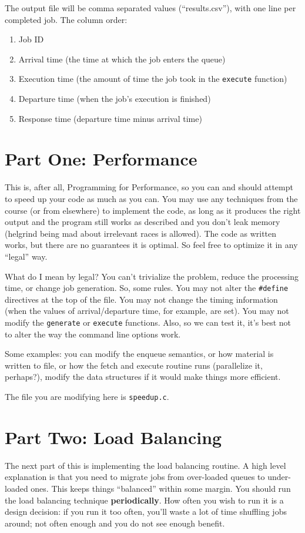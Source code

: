 \documentclass[letterpaper,10pt]{article}
\begin{document}
The output file will be comma separated values (``results.csv''), with one line per completed job. The column order:
\begin{enumerate}
	\item Job ID
	\item Arrival time (the time at which the job enters the queue)
	\item Execution time (the amount of time the job took in the \texttt{execute} function)
	\item Departure time (when the job's execution is finished)
	\item Response time (departure time minus arrival time)
\end{enumerate}


\section*{Part One: Performance}

This is, after all, Programming for Performance, so you can and should attempt to speed up your code as much as you can. You may use any techniques from the course (or from elsewhere) to implement the code, as long as it produces the right output and the program still works as described and you don't leak memory (helgrind being mad about irrelevant races is allowed). The code as written works, but there are no guarantees it is optimal. So feel free to optimize it in any ``legal'' way.

What do I mean by legal? You can't trivialize the problem, reduce the processing time, or change job generation. So, some rules. You may not alter the \texttt{\#define} directives at the top of the file. You may not change the timing information (when the values of arrival/departure time, for example, are set). You may not modify the \texttt{generate} or \texttt{execute} functions. Also, so we can test it, it's best not to alter the way the command line options work.

Some examples: you can modify the enqueue semantics, or how material is written to file, or how the fetch and execute routine runs (parallelize it, perhaps?), modify the data structures if it would make things more efficient.

The file you are modifying here is \texttt{speedup.c}.


\section*{Part Two: Load Balancing}
The next part of this is implementing the load balancing routine. A high level explanation is that you need to migrate jobs from over-loaded queues to under-loaded ones. This keeps things ``balanced'' within some margin. You should run the load balancing technique \textbf{periodically}. How often you wish to run it is a design decision: if you run it too often, you'll waste a lot of time shuffling jobs around; not often enough and you do not see enough benefit.
\end{document}
